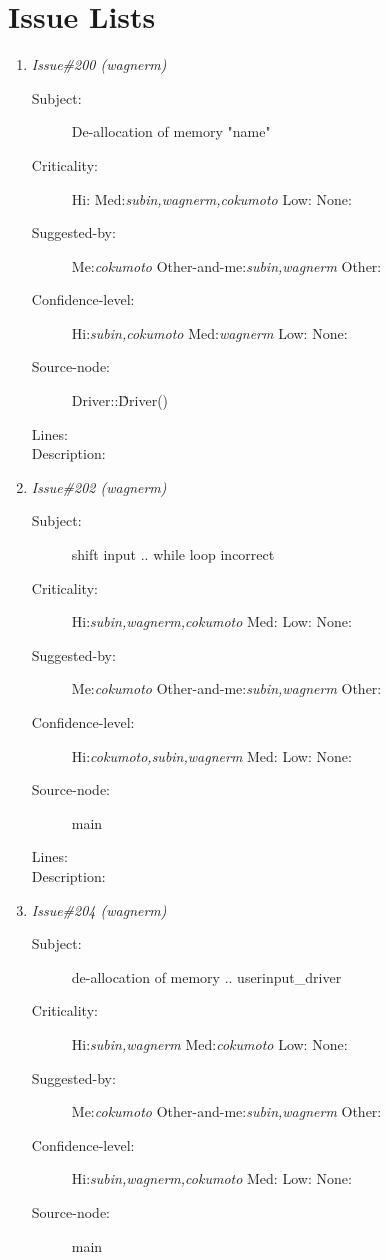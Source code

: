 \section{Issue Lists}
\begin{enumerate}
\item {\it Issue\#200 (wagnerm)}
\begin{description}
\item [Subject:] De-allocation of memory "name"
\item [Criticality:] Hi:{\it } Med:{\it subin,wagnerm,cokumoto} Low:{\it } None:{\it }
\item [Suggested-by:] Me:{\it cokumoto} Other-and-me:{\it subin,wagnerm} Other:{\it }
\item [Confidence-level:] Hi:{\it subin,cokumoto} Med:{\it wagnerm} Low:{\it } None:{\it }
\item [Source-node:] Driver::\~Driver()

\item [Lines:] 

\item [Description:] 
\end{description}
\item {\it Issue\#202 (wagnerm)}
\begin{description}
\item [Subject:] shift input .. while loop incorrect
\item [Criticality:] Hi:{\it subin,wagnerm,cokumoto} Med:{\it } Low:{\it } None:{\it }
\item [Suggested-by:] Me:{\it cokumoto} Other-and-me:{\it subin,wagnerm} Other:{\it }
\item [Confidence-level:] Hi:{\it cokumoto,subin,wagnerm} Med:{\it } Low:{\it } None:{\it }
\item [Source-node:] main

\item [Lines:] 

\item [Description:] 
\end{description}
\item {\it Issue\#204 (wagnerm)}
\begin{description}
\item [Subject:] de-allocation of memory .. userinput\_driver
\item [Criticality:] Hi:{\it subin,wagnerm} Med:{\it cokumoto} Low:{\it } None:{\it }
\item [Suggested-by:] Me:{\it cokumoto} Other-and-me:{\it subin,wagnerm} Other:{\it }
\item [Confidence-level:] Hi:{\it subin,wagnerm,cokumoto} Med:{\it } Low:{\it } None:{\it }
\item [Source-node:] main


\end{description}
\end{enumerate}
